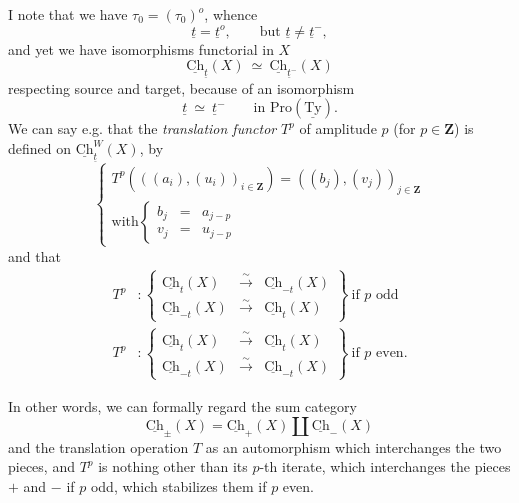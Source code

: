 \documentclass[11pt]{article}
\newcommand{\printedpage}[1]{\marginpar{\footnotesize p.~#1}}
\newcommand{\msp}[1]{\marginpar{\footnotesize [#1]}}
\newcommand{\Ch}{\underline{\mathrm{Ch}}}
\newcommand{\Ty}{\underline{\mathrm{Ty}}}
\begin{document}
I note that we have $\tau_0 = (\tau_0)^o$, whence
\[
\underline{t} = \underline{t}^o, \qquad \text{but } \underline{t} \neq \underline{t}^-,
\]
and yet we have isomorphisms functorial in $X$
\[
\Ch_{\underline{t}}(X) \ \simeq \ \Ch_{\underline{t}^-}(X)
\]
respecting source and target, because of an isomorphism
\[
\underline{t} \ \simeq \ \underline{t}^- \qquad \text{in Pro}(\Ty).
\]
We can say e.g. that the \textit{translation functor} $T^p$ of amplitude $p$ (for $p \in \mathbf{Z}$) is defined on $\Ch^{W}_{\underline{t}}(X)$, by
\[
\left\{ \begin{array}{l}
T^p(((a_i),(u_i))_{i \in \mathbf{Z}}) = ((b_j),(v_j))_{j \in \mathbf{Z}} \\[1ex]
\text{with} \left\{ \begin{array}{lcl} b_j & = & a_{j-p} \\[1ex] v_j & = & u_{j-p} \end{array} \right.
\end{array} \right.
\]
and that
\[
\begin{aligned}
T^p &: \left\{ \begin{array}{lcl} \Ch_{t}(X) & \xrightarrow{\sim} & \Ch_{-t}(X) \\[1ex] \Ch_{-t}(X) & \xrightarrow{\sim} & \Ch_{t}(X) \end{array} \right\} \ \text{if } p \text{ odd} \\
T^p &: \left\{ \begin{array}{lcl} \Ch_{t}(X) & \xrightarrow{\sim} & \Ch_{t}(X) \\[1ex] \Ch_{-t}(X) & \xrightarrow{\sim} & \Ch_{-t}(X) \end{array} \right\} \ \text{if } p \text{ even.}
\end{aligned} %
\]

\msp{page 148}
In other words, we can formally regard the sum category
\[
\Ch_{\pm}(X) = \Ch_{+}(X) \amalg \Ch_{-}(X)
\]
and the translation operation $T$ as an automorphism which interchanges the two pieces, and $T^p$ is nothing other than its $p$-th iterate, which interchanges the pieces $+$ and $-$ if $p$ odd, which stabilizes them if $p$ even.

\printedpage{93}
\end{document}
